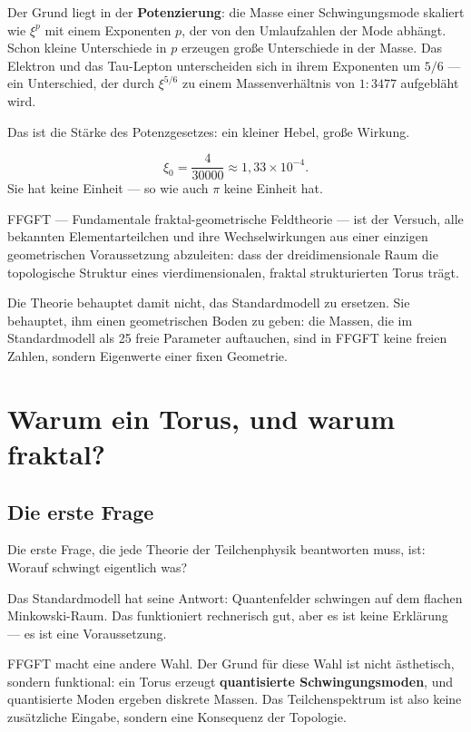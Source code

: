 \documentclass[12pt,oneside]{book}
\begin{document}
Der Grund liegt in der \textbf{Potenzierung}: die Masse einer Schwingungsmode skaliert wie $\xi^p$ mit einem Exponenten $p$, der von den Um\-lauf\-zahlen der Mode abhängt. Schon kleine Unterschiede in $p$ erzeugen große Unterschiede in der Masse. Das Elektron und das Tau-Lepton unterscheiden sich in ihrem Exponenten um $5/6$ — ein Unterschied, der durch $\xi^{5/6}$ zu einem Massenverhältnis von $1 : 3477$ aufgebläht wird.

Das ist die Stärke des Potenzgesetzes: ein kleiner Hebel, große Wirkung.

\begin{merkbox}
\[
\xi_0 = \frac{4}{30000} \approx 1{,}33 \times 10^{-4}.
\]
Sie hat keine Einheit — so wie auch $\pi$ keine Einheit hat.
\end{merkbox}

FFGFT — Fundamentale fraktal-geometrische Feldtheorie — ist der Versuch, alle bekannten Elementarteilchen und ihre Wechselwirkungen aus einer einzigen geometrischen Voraussetzung abzuleiten: dass der dreidimensionale Raum die topologische Struktur eines vier\-dimen\-sio\-nalen, fraktal strukturierten Torus trägt.

Die Theorie behauptet damit nicht, das Standardmodell zu ersetzen. Sie behauptet, ihm einen geometrischen Boden zu geben: die Massen, die im Standardmodell als 25 freie Parameter auftauchen, sind in FFGFT keine freien Zahlen, sondern Eigenwerte einer fixen Geometrie.

\chapter{Warum ein Torus, und warum fraktal?}

\section{Die erste Frage}

Die erste Frage, die jede Theorie der Teilchenphysik beantworten muss, ist: Worauf schwingt eigentlich was?

Das Standardmodell hat seine Antwort: Quantenfelder schwingen auf dem flachen Minkowski-Raum. Das funktioniert rechnerisch gut, aber es ist keine Erklärung — es ist eine Voraussetzung.

FFGFT macht eine andere Wahl. Der Grund für diese Wahl ist nicht ästhetisch, sondern funktional: ein Torus erzeugt \textbf{quantisierte Schwingungsmoden}, und quantisierte Moden ergeben diskrete Massen. Das Teilchenspektrum ist also keine zusätzliche Eingabe, sondern eine Konsequenz der Topologie.
\end{document}

